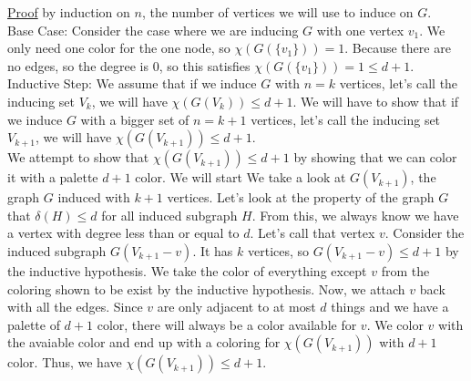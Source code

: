 \documentclass[10pt]{article}
\begin{document}
\underline{Proof} by induction on $n$, the number of vertices we will use to induce on $G$.\\

Base Case: Consider the case where we are inducing $G$ with one vertex $v_1$. 
We only need one color for the one node, so $\chi(G(\{v_1\})) = 1$.
Because there are no edges, so the degree is 0, so this satisfies $\chi(G(\{v_1\})) = 1 \leq d + 1$.\\

Inductive Step: We assume that if we induce $G$ with $n=k$ vertices, let's call the inducing 
set $V_k$, we will have $\chi(G(V_k)) \leq d+1$. We will have to show that if we induce 
$G$ with a bigger set of $n=k+1$ vertices, let's call the inducing set $V_{k+1}$, we will have 
$\chi(G(V_{k+1})) \leq d+1$.\\

We attempt to show that $\chi(G(V_{k+1})) \leq d+1$ by showing that we can color it with a palette $d+1$ color.
We will start We take a look at $G(V_{k+1})$, the graph $G$ induced with $k+1$ vertices. Let's look at the property of
the graph $G$ that $\delta(H) \leq d$ for all induced subgraph $H$. From this, we always know 
we have a vertex with degree less than or equal to $d$. Let's call that vertex $v$. Consider the 
induced subgraph $G(V_{k+1}-v)$. It has $k$ vertices, so $G(V_{k+1}-v) \leq d+1$ by the inductive hypothesis.
We take the color of everything except $v$ from the coloring shown to be exist by the inductive hypothesis.
Now, we attach $v$ back with all the edges. Since $v$ are only adjacent to at most $d$ things and we have a palette of $d+1$ color,
there will always be a color available for $v$. We color $v$ with the avaiable color and end up with a coloring for 
$\chi(G(V_{k+1}))$ with $d+1$ color. Thus, we have $\chi(G(V_{k+1})) \leq d+1$.
\end{document}
